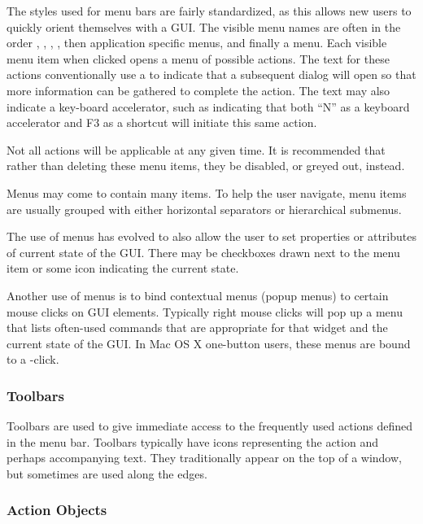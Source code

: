The styles used for menu bars are fairly standardized, as this allows
new users to quickly orient themselves with a GUI. The visible menu
names are often in the order , , ,
, then application specific menus, and finally a
 menu. Each visible menu item when clicked opens a menu of
possible actions. The text for these actions conventionally use a
  to indicate that a subsequent dialog will open so that
more information can be gathered to complete the action. The text may
also indicate a key-board accelerator, such as  indicating that both ``N'' as a keyboard
accelerator and F3 as a shortcut will initiate this same action.

Not all actions will be applicable at any given time. It is
recommended that rather than deleting these menu items, they be
disabled, or greyed out, instead. %

Menus may come to contain many items. To help the user navigate, menu
items are usually grouped with either horizontal separators or
hierarchical submenus. %

The use of menus has evolved to also allow the user to set properties
or attributes of current state of the GUI. There may be checkboxes
drawn next to the menu item or some icon indicating the current state.

Another use of menus is to bind contextual menus (popup menus) to
certain mouse clicks on GUI elements. Typically right mouse clicks
will pop up a menu that lists often-used commands that are appropriate
for that widget and the current state of the GUI. In Mac OS X
one-button users, these menus are bound to a -click.

\subsubsection{Toolbars}
\label{sec:GUI:toolbars}

Toolbars are used to give immediate access to the frequently used actions
defined in the menu bar. Toolbars typically have icons representing the
action and perhaps accompanying text. They traditionally appear on the
top of a window, but sometimes are used along the edges. 

\subsubsection{Action Objects}
\label{sec:GUI:actions}

